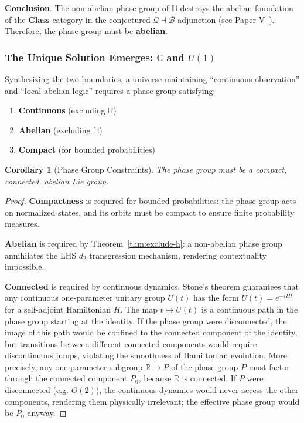 \documentclass[11pt]{article}
\newtheorem{corollary}[theorem]{Corollary}
\begin{document}
\textbf{Conclusion}.
The non-abelian phase group of $\mathbb{H}$ destroys the abelian foundation of the $\mathbf{Class}$ category in the conjectured $\mathcal{Q} \dashv \mathcal{B}$ adjunction (see Paper V~\cite{PaperV}). Therefore, the phase group must be \textbf{abelian}.

\subsubsection{The Unique Solution Emerges: $\mathbb{C}$ and $U(1)$}
\label{unique-solution}

Synthesizing the two boundaries, a universe maintaining ``continuous observation'' and ``local abelian logic'' requires a phase group satisfying:
\begin{enumerate}
\item \textbf{Continuous} (excluding $\mathbb{R}$)
\item \textbf{Abelian} (excluding $\mathbb{H}$)
\item \textbf{Compact} (for bounded probabilities)
\end{enumerate}

\begin{corollary}[Phase Group Constraints]\label{cor:phase-constraints}
The phase group must be a compact, connected, abelian Lie group.
\end{corollary}

\begin{proof}
\textbf{Compactness} is required for bounded probabilities: the phase group acts on normalized states, and its orbits must be compact to ensure finite probability measures.

\textbf{Abelian} is required by Theorem~\ref{thm:exclude-h}: a non-abelian phase group annihilates the LHS $d_2$ transgression mechanism, rendering contextuality impossible.

\textbf{Connected} is required by continuous dynamics. Stone's theorem guarantees that any continuous one-parameter unitary group $U(t)$ has the form $U(t) = e^{-iHt}$ for a self-adjoint Hamiltonian $H$. The map $t \mapsto U(t)$ is a continuous path in the phase group starting at the identity. If the phase group were disconnected, the image of this path would be confined to the connected component of the identity, but transitions between different connected components would require discontinuous jumps, violating the smoothness of Hamiltonian evolution. More precisely, any one-parameter subgroup $\mathbb{R} \to P$ of the phase group $P$ must factor through the connected component $P_0$, because $\mathbb{R}$ is connected. If $P$ were disconnected (e.g. $O(2)$), the continuous dynamics would never access the other components, rendering them physically irrelevant; the effective phase group would be $P_0$ anyway.
\end{proof}
\end{document}
